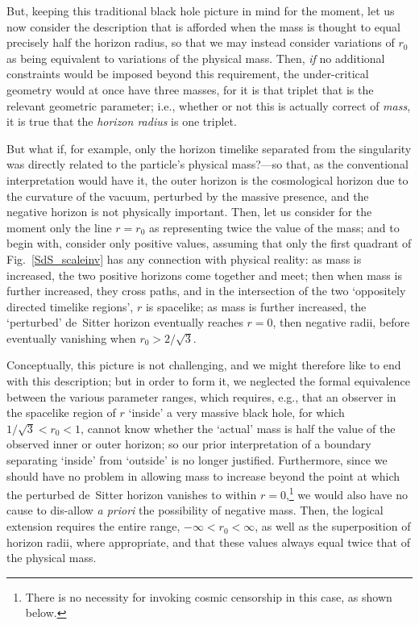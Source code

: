But, keeping this traditional black hole picture in mind for the moment, let us now consider the description that is afforded when the mass is thought to equal precisely half the horizon radius, so that we may instead consider variations of $r_0$ as being equivalent to variations of the physical mass. Then, \textit{if} no additional constraints would be imposed beyond this requirement, the under-critical geometry would at once have three masses, for it is that triplet that is the relevant geometric parameter; i.e., whether or not this is actually correct of \textit{mass}, it is true that the \textit{horizon radius} is one triplet.

But what if, for example, only the horizon timelike separated from the singularity was directly related to the particle's physical mass?---so that, as the conventional interpretation would have it, the outer horizon is the cosmological horizon due to the curvature of the vacuum, perturbed by the massive presence, and the negative horizon is not physically important. Then, let us consider for the moment only the line $r=r_0$ as representing twice the value of the mass; and to begin with, consider only positive values, assuming that only the first quadrant of Fig.~\ref{SdS_scaleinv} has any connection with physical reality: as mass is increased, the two positive horizons come together and meet; then when mass is further increased, they cross paths, and in the intersection of the two `oppositely directed timelike regions', $r$ is spacelike; as mass is further increased, the `perturbed' de~Sitter horizon eventually reaches $r=0$, then negative radii, before eventually vanishing when $r_0>2/\sqrt{3}$.

Conceptually, this picture is not challenging, and we might therefore like to end with this description; but in order to form it, we neglected the formal equivalence between the various parameter ranges, which requires, e.g., that an observer in the spacelike region of $r$ `inside' a very massive black hole, for which $1/\sqrt{3}<r_0<1$, cannot know whether the `actual' mass is half the value of the observed inner or outer horizon; so our prior interpretation of a boundary separating `inside' from `outside' is no longer justified. Furthermore, since we should have no problem in allowing mass to increase beyond the point at which the perturbed de~Sitter horizon vanishes to within $r=0$,\footnote{There is no necessity for invoking cosmic censorship in this case, as shown below.} we would also have no cause to dis-allow \textit{a priori} the possibility of negative mass. Then, the logical extension requires the entire range, $-\infty<r_0<\infty$, as well as the superposition of horizon radii, where appropriate, and that these values always equal twice that of the physical mass.

